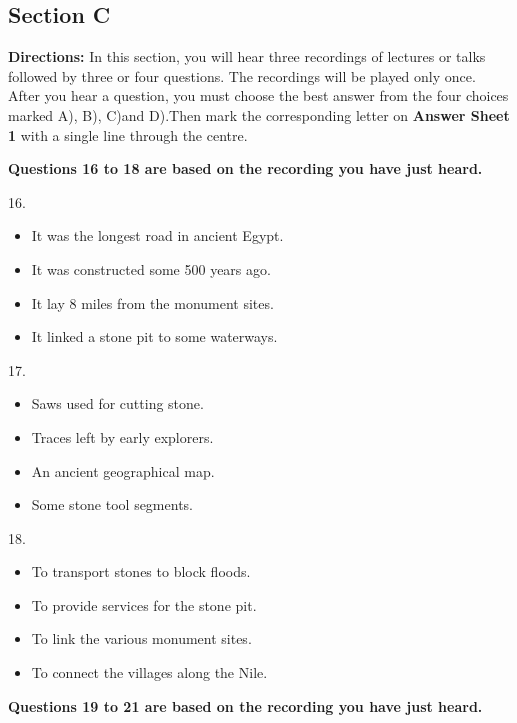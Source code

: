 \documentclass[UTF8,11pt]{ctexart}
\begin{document}
\subsection*{\textbf{Section C}}


\textbf{Directions:} In this section, you will hear three recordings of lectures or talks followed by three or four questions. The recordings will be played only once. After you hear a question, you must choose the best answer from the four choices marked A), B), C)and D).Then mark the corresponding letter on\textbf{ Answer Sheet 1} with a single line through the centre.


\textbf{Questions 16 to 18 are based on the recording you have just heard.}


16.


\begin{itemize}[leftmargin=2em,itemsep=.2em,topsep=.4em]\item[A.] It was the longest road in ancient Egypt.
\item[B.] It was constructed some 500 years ago.
\item[C.] It lay 8 miles from the monument sites.
\item[D.] It linked a stone pit to some waterways.
\end{itemize}

17.


\begin{itemize}[leftmargin=2em,itemsep=.2em,topsep=.4em]\item[A.] Saws used for cutting stone.
\item[B.] Traces left by early explorers.
\item[C.] An ancient geographical map.
\item[D.] Some stone tool segments.
\end{itemize}

18.


\begin{itemize}[leftmargin=2em,itemsep=.2em,topsep=.4em]\item[A.] To transport stones to block floods.
\item[B.] To provide services for the stone pit.
\item[C.] To link the various monument sites.
\item[D.] To connect the villages along the Nile.
\end{itemize}

\textbf{Questions 19 to 21 are based on the recording you have just heard.}
\end{document}
